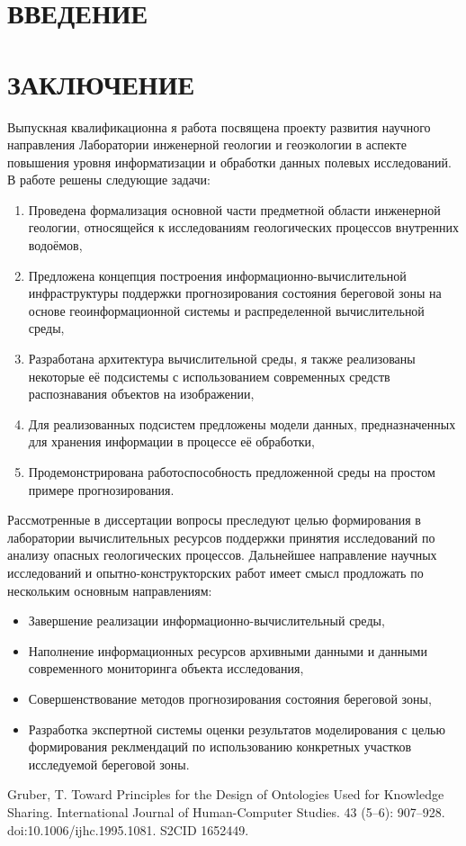 \documentclass[732,14pt]{studrep}
\begin{document}
\thispagestyle{empty}
\clearpage
 
\tableofcontents

\chapter*{ВВЕДЕНИЕ}
\label{chap:intro}

\chapter*{ЗАКЛЮЧЕНИЕ}

Выпускная квалификационна я работа посвящена проекту развития научного направления Лаборатории инженерной геологии и геоэкологии в аспекте повышения уровня информатизации и обработки данных полевых исследований. В работе решены следующие задачи:
\begin{enumerate}
  \item Проведена формализация основной части предметной области инженерной геологии, относящейся к исследованиям геологических процессов внутренних водоёмов,
  \item Предложена концепция построения информационно-вычислительной инфраструктуры поддержки прогнозирования состояния береговой зоны на основе геоинформационной системы и распределенной вычислительной среды,
  \item Разработана архитектура вычислительной среды, я также реализованы некоторые её подсистемы с использованием современных средств распознавания объектов на изображении,
  \item Для реализованных подсистем предложены модели данных, предназначенных для хранения информации в процессе её обработки,
  \item Продемонстрирована работоспособность предложенной среды на простом примере прогнозирования.
\end{enumerate}

Рассмотренные в диссертации вопросы преследуют целью формирования в лаборатории вычислительных ресурсов поддержки принятия исследований по анализу опасных геологических процессов. Дальнейшее направление научных исследований и опытно-конструкторских работ имеет смысл продложать по нескольким основным направлениям:
\begin{itemize}
  \item Завершение реализации информационно-вычислительный среды,
  \item Наполнение информационных ресурсов архивными данными и данными современного мониторинга объекта исследования,
  \item Совершенствование методов прогнозирования состояния береговой зоны,
  \item Разработка экспертной системы оценки результатов моделирования с целью формирования реклмендаций по использованию конкретных участков исследуемой береговой зоны.
\end{itemize}



      

\begin{thebibliography}{99}
  

   Gruber, T. Toward Principles for the Design of Ontologies Used for Knowledge Sharing. International Journal of Human-Computer Studies. 43 (5–6): 907–928. doi:10.1006/ijhc.1995.1081. S2CID 1652449.
\end{thebibliography}
\end{document}
